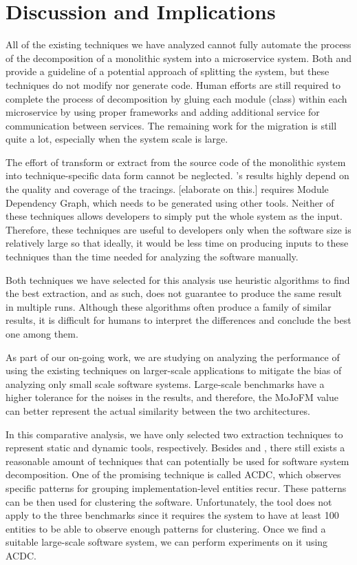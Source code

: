 \section{Discussion and Implications}
\label{sec:discussion}


All of the existing techniques we have analyzed cannot fully automate the process of the decomposition of a monolithic system into a microservice system. Both \fs and \bn provide a guideline of a potential approach of splitting the system, but these techniques do not modify nor generate code. Human efforts are still required to complete the process of decomposition by gluing each module (class) within each microservice by using proper frameworks and adding additional service for communication between services. The remaining work for the migration is still quite a lot, especially when the system scale is large. 

The effort of transform or extract from the source code of the monolithic system into technique-specific data form cannot be neglected. \fs's results highly depend on the quality and coverage of the tracings. [elaborate on this.] \bn requires Module Dependency Graph, which needs to be generated using other tools. Neither of these techniques allows developers to simply put the whole system as the input. Therefore, these techniques are useful to developers only when the software size is relatively large so that ideally, it would be less time on producing inputs to these techniques than the time needed for analyzing the software manually. 

Both techniques we have selected for this analysis use heuristic algorithms to find the best extraction, and as such, does not guarantee to produce the same result in multiple runs. Although these algorithms often produce a family of similar results, it is difficult for humans to interpret the differences and conclude the best one among them.

As part of our on-going work, we are studying on analyzing the performance of using the existing techniques on larger-scale applications to mitigate the bias of analyzing only small scale software systems. Large-scale benchmarks have a higher tolerance for the noises in the results, and therefore, the MoJoFM value can better represent the actual similarity between the two architectures. 

In this comparative analysis, we have only selected two extraction techniques to represent static and dynamic tools, respectively. Besides \fs and \bn, there still exists a reasonable amount of techniques that can potentially be used for software system decomposition. One of the promising technique is called ACDC, which observes specific patterns for grouping implementation-level entities recur. These patterns can be then used for clustering the software. Unfortunately, the tool does not apply to the three benchmarks since it requires the system to have at least 100 entities to be able to observe enough patterns for clustering. Once we find a suitable large-scale software system, we can perform experiments on it using ACDC.

